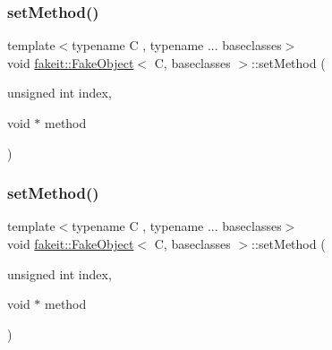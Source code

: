 \subsubsection{\texorpdfstring{setMethod()}{setMethod()}\hspace{0.1cm}{\footnotesize\ttfamily [6/9]}}
{\footnotesize\ttfamily template$<$typename C , typename ... baseclasses$>$ \\
void \mbox{\hyperlink{classfakeit_1_1FakeObject}{fakeit\+::\+Fake\+Object}}$<$ C, baseclasses $>$\+::set\+Method (\begin{DoxyParamCaption}\item[{unsigned int}]{index,  }\item[{void $\ast$}]{method }\end{DoxyParamCaption})\hspace{0.3cm}{\ttfamily [inline]}}

\mbox{\label{classfakeit_1_1FakeObject_ad05ea03dec6dc302d6d7b62e47bd1219}} 
\subsubsection{\texorpdfstring{setMethod()}{setMethod()}\hspace{0.1cm}{\footnotesize\ttfamily [7/9]}}
{\footnotesize\ttfamily template$<$typename C , typename ... baseclasses$>$ \\
void \mbox{\hyperlink{classfakeit_1_1FakeObject}{fakeit\+::\+Fake\+Object}}$<$ C, baseclasses $>$\+::set\+Method (\begin{DoxyParamCaption}\item[{unsigned int}]{index,  }\item[{void $\ast$}]{method }\end{DoxyParamCaption})\hspace{0.3cm}{\ttfamily [inline]}}

\mbox{\label{classfakeit_1_1FakeObject_ad05ea03dec6dc302d6d7b62e47bd1219}} 
